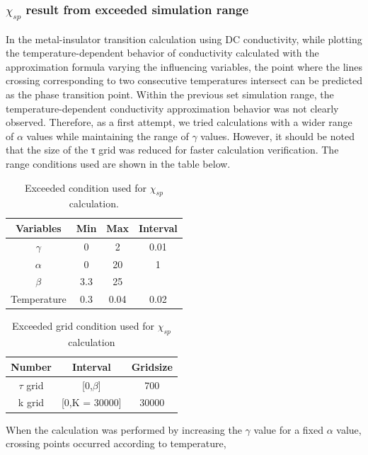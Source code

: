 \documentclass{article}[12pt]
\begin{document}
\begin{spacing}{1.5}
\subsubsection*{$\chi_{sp}$ result from exceeded simulation range}
In the metal-insulator transition calculation using DC conductivity, 
while plotting the temperature-dependent behavior of conductivity calculated with the approximation formula varying the influencing variables, 
the point where the lines crossing corresponding to two consecutive temperatures intersect can be predicted as the phase transition point.
Within the previous set simulation range, 
the temperature-dependent conductivity approximation behavior was not clearly observed. 
Therefore, as a first attempt, we tried calculations with a wider range of $\alpha$ values while maintaining the range of $\gamma$ values. 
However, it should be noted that the size of the τ grid was reduced for faster calculation verification. 
The range conditions used are shown in the table below.
\begin{table}[htbp]
  \centering
  \renewcommand{\arraystretch}{1.2}  %
  \begin{tabular}{@{}cccc@{}}
  \toprule
  \textbf{Variables} & \textbf{Min} & \textbf{Max}  & \textbf{Interval}\\ 
  \midrule
  $\gamma$ & 0 & 2 & 0.01 \\
  $\alpha$ & 0 & 20 & 1 \\
  $\beta$ & 3.3 & 25 &  \\
  Temperature & 0.3 & 0.04 & 0.02 \\
  \bottomrule
  \end{tabular}
  \caption{Exceeded condition used for $\chi_{sp}$ calculation.}
  \end{table}
\begin{table}[htbp]
  \centering
  \renewcommand{\arraystretch}{1.2}  %
  \begin{tabular}{@{}ccc@{}}
  \toprule
  \textbf{Number} & \textbf{Interval} & \textbf{Gridsize}\\ 
  \midrule
  $\tau$ grid & [0,$\beta$] & 700 \\
  k grid & [0,K = 30000] & 30000 \\
  \bottomrule
  \end{tabular}
  \caption{Exceeded grid condition used for $\chi_{sp}$ calculation}
  \end{table}
When the calculation was performed by increasing the $\gamma$ value for a fixed $\alpha$ value, crossing points occurred according to temperature, 

\end{spacing}
\end{document}
